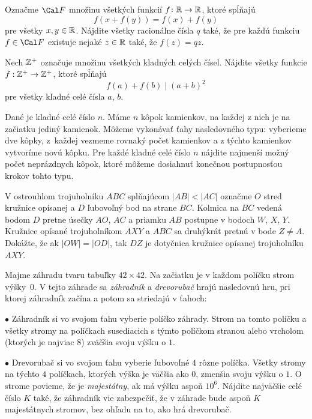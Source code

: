 {%
Označme ${\Cal F}$ množinu všetkých funkcií $f\colon\Bbb R\rightarrow\Bbb R$, ktoré spĺňajú $$f(x+f(y))=f(x)+f(y)$$ pre všetky $x,y\in\Bbb R$. Nájdite všetky racionálne čísla $q$ také, že pre každú funkciu $f\in{\Cal F}$ existuje nejaké $z\in\Bbb R$ také, že $f(z)=qz$.}

{%
Nech $\Bbb Z^+$ označuje množinu všetkých kladných celých čísel. Nájdite všetky funkcie $f: \Bbb Z^+\rightarrow \Bbb Z^+$, ktoré spĺňajú $$f(a)+f(b)\mid (a+b)^2$$
pre všetky kladné celé čísla $a$, $b$.
}
\podpis{}

{%
Dané je kladné celé číslo $n$. Máme $n$ kôpok kamienkov, na každej z nich je na začiatku jediný kamienok. Môžeme vykonávať ťahy nasledovného typu: vyberieme dve kôpky, z~každej vezmeme rovnaký počet kamienkov a z týchto kamienkov vytvoríme novú kôpku.
\smallskip
Pre každé kladné celé číslo $n$ nájdite najmenší možný počet neprázdnych kôpok, ktoré môžeme dosiahnuť konečnou postupnosťou krokov tohto typu.
}

{%
V ostrouhlom trojuholníku $ABC$ splňajúcom $|AB|<|AC|$ označme $O$ stred kružnice opísanej a $D$ ľubovoľný bod na strane $BC$. Kolmica na $BC$ vedená bodom $D$ pretne úsečky $AO$, $AC$ a priamku $AB$ postupne v bodoch $W$, $X$, $Y$.
Kružnice opísané trojuholníkom $AXY$ a $ABC$ sa druhýkrát pretnú v bode $Z\ne A$.
Dokážte, že ak $|OW|=|OD|$, tak $DZ$ je dotyčnica kružnice opísanej trojuholníku $AXY$.}

{%
Majme záhradu tvaru tabuľky $42 \times 42$. Na začiatku je v každom políčku strom výšky~$0$. V tejto záhrade sa {\it záhradník} a {\it drevorubač} hrajú nasledovnú hru, pri ktorej záhradník začína a potom sa striedajú v ťahoch:
\item{$\bullet$} Záhradník si vo svojom ťahu vyberie políčko záhrady. Strom na tomto políčku a všetky stromy na políčkach susediacich s týmto políčkom stranou alebo vrcholom (ktorých je najviac $8$) zväčšia svoju výšku o $1$.
\item{$\bullet$} Drevorubač si vo svojom ťahu vyberie ľubovoľné $4$ rôzne políčka. Všetky stromy na týchto $4$ políčkach, ktorých výška je väčšia ako $0$, zmenšia svoju výšku o $1$.
\endgraf\noindent
O strome povieme, že je {\it majestátny}, ak má výšku aspoň $10^6$. Nájdite najväčšie celé číslo $K$ také, že záhradník vie zabezpečiť, že v záhrade bude aspoň $K$ majestátnych stromov, bez ohľadu na to, ako hrá drevorubač.}

